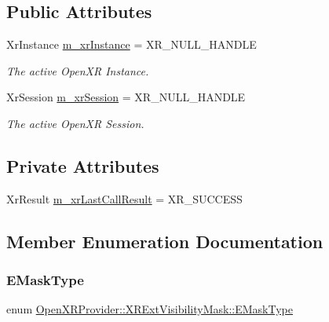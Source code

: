 \subsection*{Public Attributes}
\begin{DoxyCompactItemize}
\item 
Xr\+Instance \mbox{\hyperlink{class_open_x_r_provider_1_1_x_r_ext_visibility_mask_ab44f504f9549760d91f08f09a3036d51}{m\+\_\+xr\+Instance}} = X\+R\+\_\+\+N\+U\+L\+L\+\_\+\+H\+A\+N\+D\+LE
\begin{DoxyCompactList}\small\item\em The active Open\+XR Instance. \end{DoxyCompactList}\item 
Xr\+Session \mbox{\hyperlink{class_open_x_r_provider_1_1_x_r_ext_visibility_mask_a9329d2062215a848d8b9e937036d1ee3}{m\+\_\+xr\+Session}} = X\+R\+\_\+\+N\+U\+L\+L\+\_\+\+H\+A\+N\+D\+LE
\begin{DoxyCompactList}\small\item\em The active Open\+XR Session. \end{DoxyCompactList}\end{DoxyCompactItemize}
\subsection*{Private Attributes}
\begin{DoxyCompactItemize}
\item 
Xr\+Result \mbox{\hyperlink{class_open_x_r_provider_1_1_x_r_ext_visibility_mask_a723f9f77ad7e320d4857b3c082009e46}{m\+\_\+xr\+Last\+Call\+Result}} = X\+R\+\_\+\+S\+U\+C\+C\+E\+SS
\end{DoxyCompactItemize}


\subsection{Member Enumeration Documentation}
\mbox{\label{class_open_x_r_provider_1_1_x_r_ext_visibility_mask_a80c9de64fb067663f183e0b36a819b41}} 
\subsubsection{\texorpdfstring{EMaskType}{EMaskType}}
{\footnotesize\ttfamily enum \mbox{\hyperlink{class_open_x_r_provider_1_1_x_r_ext_visibility_mask_a80c9de64fb067663f183e0b36a819b41}{Open\+X\+R\+Provider\+::\+X\+R\+Ext\+Visibility\+Mask\+::\+E\+Mask\+Type}}}



